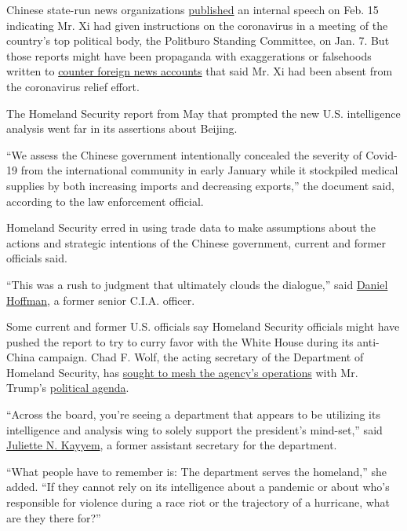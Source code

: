 Chinese state-run news organizations
\href{https://www.nytimes3xbfgragh.onion/2020/02/15/world/asia/xi-china-coronavirus.html}{published}
an internal speech on Feb. 15 indicating Mr. Xi had given instructions
on the coronavirus in a meeting of the country's top political body, the
Politburo Standing Committee, on Jan. 7. But those reports might have
been propaganda with exaggerations or falsehoods written to
\href{https://www.nytimes3xbfgragh.onion/2020/02/08/world/asia/xi-coronavirus-china.html}{counter
foreign news accounts} that said Mr. Xi had been absent from the
coronavirus relief effort.

The Homeland Security report from May that prompted the new U.S.
intelligence analysis went far in its assertions about Beijing.

``We assess the Chinese government intentionally concealed the severity
of Covid-19 from the international community in early January while it
stockpiled medical supplies by both increasing imports and decreasing
exports,'' the document said, according to the law enforcement official.

Homeland Security erred in using trade data to make assumptions about
the actions and strategic intentions of the Chinese government, current
and former officials said.

``This was a rush to judgment that ultimately clouds the dialogue,''
said
\href{https://www.npr.org/2017/08/08/542106975/cover-lifted-a-cia-spy-offers-his-take-on-trump-and-russia}{Daniel
Hoffman}, a former senior C.I.A. officer.

Some current and former U.S. officials say Homeland Security officials
might have pushed the report to try to curry favor with the White House
during its anti-China campaign. Chad F. Wolf, the acting secretary of
the Department of Homeland Security, has
\href{https://www.nytimes3xbfgragh.onion/2020/08/04/us/politics/trump-homeland-security.html}{sought
to mesh the agency's operations} with Mr. Trump's
\href{https://www.nytimes3xbfgragh.onion/2020/07/31/us/politics/homeland-security-portland.html}{political
agenda}.

``Across the board, you're seeing a department that appears to be
utilizing its intelligence and analysis wing to solely support the
president's mind-set,'' said
\href{https://www.hks.harvard.edu/faculty/juliette-kayyem}{Juliette N.
Kayyem}, a former assistant secretary for the department.

``What people have to remember is: The department serves the homeland,''
she added. ``If they cannot rely on its intelligence about a pandemic or
about who's responsible for violence during a race riot or the
trajectory of a hurricane, what are they there for?''

